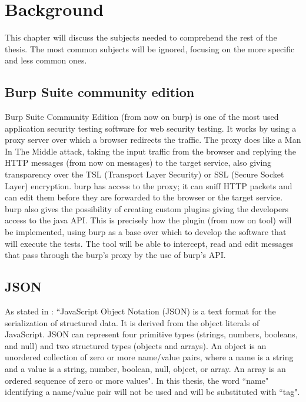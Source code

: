 \chapter{Background}
\label{chap:Background}
This chapter will discuss the subjects needed to comprehend the rest of the thesis. The most common subjects will be ignored, focusing on the more specific and less common ones.

\section{Burp Suite community edition}
Burp Suite Community Edition (from now on \Gls{burp}) is one of the most used application security testing software for web security testing. It works by using a proxy server over which a browser redirects the traffic. The proxy does like a Man In The Middle attack, taking the input traffic from the browser and replying the HTTP messages (from now on messages) to the target service, also giving transparency over the TSL (Transport Layer Security) or SSL (Secure Socket Layer) encryption. \Gls{burp} has access to the proxy; it can sniff HTTP packets and can edit them before they are forwarded to the browser or the target service. \Gls{burp} also gives the possibility of creating custom plugins giving the developers access to the java API. This is precisely how the plugin (from now on tool) will be implemented, using \Gls{burp} as a base over which to develop the software that will execute the tests. The tool will be able to intercept, read and edit messages that pass through the \Gls{burp}'s proxy by the use of \Gls{burp}'s API.

\section{JSON}
As stated in \cite{json_standard}: ``JavaScript Object Notation (JSON) is a text format for the serialization of structured data.  It is derived from the object literals of JavaScript. JSON can represent four primitive types (strings, numbers, booleans, and null) and two structured types (objects and arrays). An object is an unordered collection of zero or more name/value pairs, where a name is a string and a value is a string, number, boolean, null, object, or array. An array is an ordered sequence of zero or more values".
In this thesis, the word ``name" identifying a name/value pair will not be used and will be substituted with ``tag".

